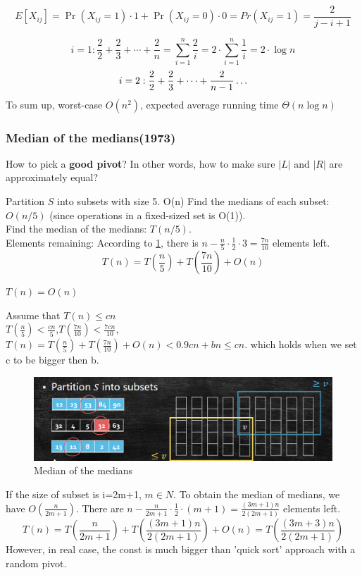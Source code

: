     \[
        E[X_{ij}]=\Pr(X_{ij}=1)\cdot 1 + \Pr(X_{ij}=0)\cdot 0=Pr(X_{ij}=1)=\frac{2}{j-i+1}\]

    \[
        i=1:\frac{2}{2}+\frac{2}{3}+\cdots+\frac{2}{n}=\sum_{i=1}^{n}\frac{2}{i}=2\cdot \sum_{i=1}^{n}\frac{1}{i}=2\cdot \log n\]
    \[
        i=2:\frac{2}{2}+\frac{2}{3}+\cdots+\frac{2}{n-1}\\
        \ldots
    \]
    To sum up, worst-case $O(n^2)$, expected average running time $\Theta(n\log n)$



\subsubsection{Median of the medians(1973)}

How to pick a \textbf{good pivot}? In other words, how to make sure $|L|$ and $|R|$ are approximately equal?

Partition $S$ into subsets with size 5. O(n)
Find the medians of each subset: $O(n/5)$ (since operations in a fixed-sized set is O(1)).\\
Find the median of the medians: $T(n/5)$.\\
Elements remaining: According to \ref{fig:medianofmedians}, there is $n-\frac{n}{5} \cdot \frac{1}{2}\cdot 3 = \frac{7n}{10}$ elements left.\\
\[
    T(n)=T(\frac{n}{5})+T(\frac{7n}{10})+O(n)\]
\begin{prf}$T(n)=O(n)$
    
Assume that $T(n) \leq cn$\\
$T(\frac{n}{5})<\frac{cn}{5}$,$T(\frac{7n}{10})<\frac{7cn}{10}$,
$T(n)=T(\frac{n}{5})+T(\frac{7n}{10})+O(n)<0.9cn+bn\leq cn$. which holds when we set c to be bigger then b.

\end{prf}

\begin{figure}
    \centering
    \includegraphics[width=0.8\linewidth]{Notes/fig/MofM.png}
    \caption{Median of the medians}
    \label{fig:medianofmedians}
\end{figure}

If the size of subset is i=2m+1, $m \in N$. To obtain the median of medians, we have $O(\frac{n}{2m+1})$. There are $n-\frac{n}{2m+1} \cdot \frac{1}{2}\cdot (m+1) = \frac{(3m+1)n}{2(2m+1)}$ elements left.
\[
    T(n)=T(\frac{n}{2m+1})+T(\frac{(3m+1)n}{2(2m+1)})+O(n)=T(\frac{(3m+3)n}{2(2m+1)})\]
However, in real case, the const is much bigger than 'quick sort' approach with a random pivot.


